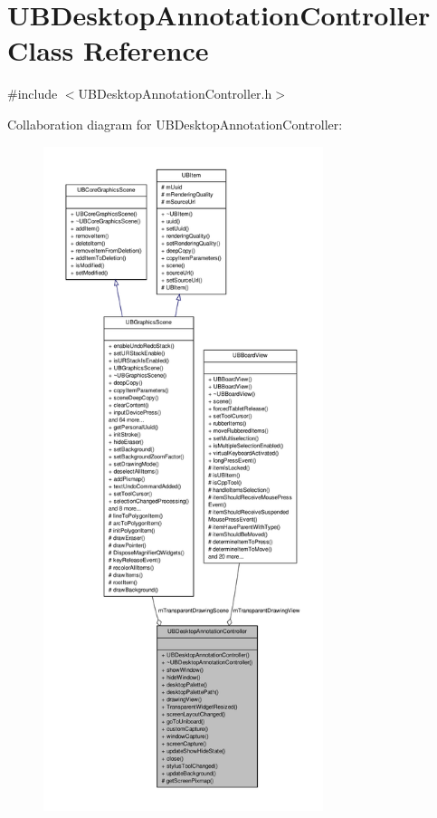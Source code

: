 \hypertarget{class_u_b_desktop_annotation_controller}{\section{U\-B\-Desktop\-Annotation\-Controller Class Reference}
\label{d7/db7/class_u_b_desktop_annotation_controller}
}


{\ttfamily \#include $<$U\-B\-Desktop\-Annotation\-Controller.\-h$>$}



Collaboration diagram for U\-B\-Desktop\-Annotation\-Controller\-:
\nopagebreak
\begin{figure}[H]
\begin{center}
\leavevmode
\includegraphics[height=550pt]{d5/d7b/class_u_b_desktop_annotation_controller__coll__graph}
\end{center}
\end{figure}

